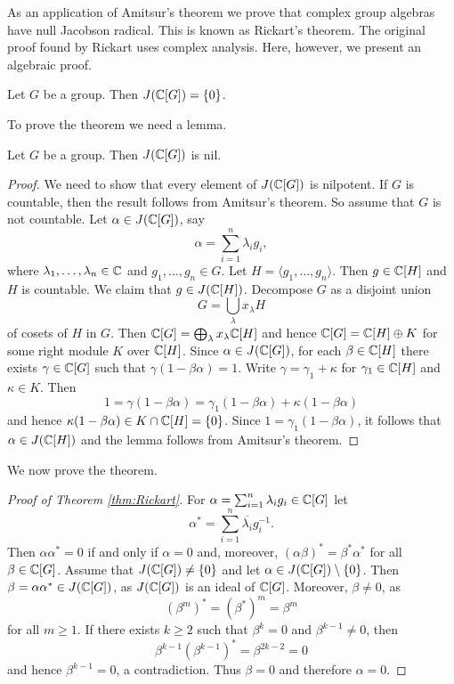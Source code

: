 As an application of Amitsur's theorem we prove that 
complex group algebras have null Jacobson radical.
This is known as 
Rickart's theorem. The original proof found by Rickart 
uses complex analysis. Here, however, 
we present an algebraic proof. 


\begin{theorem}[Rickart]
\label{thm:Rickart}
    Let $G$ be a group. Then $J(\mathbb{C}[G])=\{0\}$.
\end{theorem}

To prove the theorem we need a lemma.

\begin{lemma}
Let $G$ be a group. Then $J(\mathbb{C}[G])$ is nil.        
\end{lemma}

\begin{proof}
    We need to show that every element of $J(\mathbb{C}[G])$ is nilpotent. 
    If $G$ is countable, then the result follows from Amitsur's theorem. So assume that 
    $G$ is not countable. Let $\alpha\in J(\mathbb{C}[G])$, say
    \[
    \alpha=\sum_{i=1}^n\lambda_ig_i,
    \]
    where $\lambda_1,\dots,\lambda_n\in\mathbb{C}$ and $g_1,\dots,g_n\in G$. Let $H=\langle g_1,\dots,g_n\rangle$.
    Then $g\in \mathbb{C}[H]$ and $H$ is countable. We claim that $g\in J(\mathbb{C}[H])$. Decompose
    $G$ as a disjoint union 
    \[
    G=\bigcup_\lambda x_\lambda H
    \]
    of cosets of $H$ in $G$. Then $\mathbb{C}[G]=\bigoplus_\lambda x_\lambda\mathbb{C}[H]$ and
    hence $\mathbb{C}[G]=\mathbb{C}[H]\oplus K$ for some right module $K$ over $\mathbb{C}[H]$. Since $\alpha\in J(\mathbb{C}[G])$, for each 
    $\beta\in\mathbb{C}[H]$ there exists $\gamma\in\mathbb{C}[G]$ such that 
    $\gamma(1-\beta\alpha)=1$. Write $\gamma=\gamma_1+\kappa$ for $\gamma_1\in\mathbb{C}[H]$ and $\kappa\in K$. Then
    \[
    1=\gamma(1-\beta\alpha)=\gamma_1(1-\beta\alpha)+\kappa(1-\beta\alpha)
    \]
    and hence $\kappa(1-\beta\alpha)\in K\cap \mathbb{C}[H]=\{0\}$. Since $1=\gamma_1(1-\beta\alpha)$, it follows that
    $\alpha\in J(\mathbb{C}[H])$ and the lemma follows from Amitsur's theorem.  
\end{proof}

We now prove the theorem. 

\begin{proof}[Proof of Theorem \ref{thm:Rickart}]
    For $\alpha=\sum_{i=1}^n\lambda_ig_i\in\mathbb{C}[G]$ let 
    \[
    \alpha^*=\sum_{i=1}^n\overline{\lambda_i}g_i^{-1}.
    \]
    Then $\alpha\alpha^*=0$ if and only if $\alpha=0$ and, moreover, 
    $(\alpha\beta)^*=\beta^*\alpha^*$ for all $\beta\in\mathbb{C}[G]$. 
    Assume that $J(\mathbb{C}[G])\ne\{0\}$ and let $\alpha\in J(\mathbb{C}[G])\setminus\{0\}$. Then
    $\beta=\alpha\alpha^*\in J(\mathbb{C}[G])$, as $J(\mathbb{C}[G])$ is an ideal of $\mathbb{C}[G]$. Moreover, $\beta\ne 0$, as 
    \[
    (\beta^m)^*=(\beta^*)^m=\beta^m
    \]
    for all $m\geq1$. If there exists $k\geq2$ such that $\beta^k=0$ and $\beta^{k-1}\ne 0$, then
    \[
    \beta^{k-1}\left(\beta^{k-1}\right)^*=\beta^{2k-2}=0
    \]
    and hence $\beta^{k-1}=0$, a contradiction. Thus $\beta=0$ and therefore $\alpha=0$. 
\end{proof}

